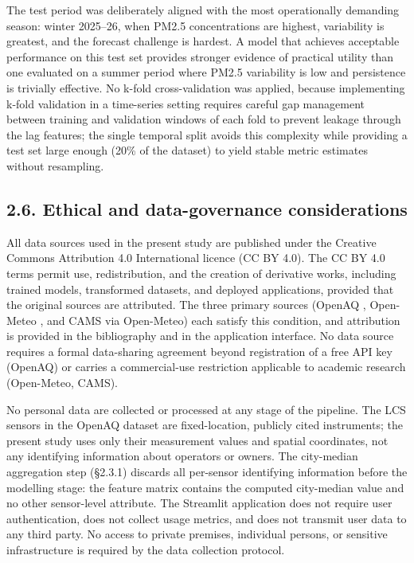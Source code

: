 The test period was deliberately aligned with the most operationally demanding season: winter 2025--26, when PM2.5 concentrations are highest, variability is greatest, and the forecast challenge is hardest. A model that achieves acceptable performance on this test set provides stronger evidence of practical utility than one evaluated on a summer period where PM2.5 variability is low and persistence is trivially effective. No k-fold cross-validation was applied, because implementing k-fold validation in a time-series setting requires careful gap management between training and validation windows of each fold to prevent leakage through the lag features; the single temporal split avoids this complexity while providing a test set large enough (20\% of the dataset) to yield stable metric estimates without resampling.

\subsection{2.6. Ethical and data-governance considerations}\label{ethical-and-data-governance-considerations}

All data sources used in the present study are published under the Creative Commons Attribution 4.0 International licence (CC BY 4.0). The CC BY 4.0 terms permit use, redistribution, and the creation of derivative works, including trained models, transformed datasets, and deployed applications, provided that the original sources are attributed. The three primary sources (OpenAQ \cite{openaq_platform}, Open-Meteo \cite{zippenfenig_openmeteo_2023}, and CAMS via Open-Meteo) each satisfy this condition, and attribution is provided in the bibliography and in the application interface. No data source requires a formal data-sharing agreement beyond registration of a free API key (OpenAQ) or carries a commercial-use restriction applicable to academic research (Open-Meteo, CAMS).

No personal data are collected or processed at any stage of the pipeline. The LCS sensors in the OpenAQ dataset are fixed-location, publicly cited instruments; the present study uses only their measurement values and spatial coordinates, not any identifying information about operators or owners. The city-median aggregation step (§2.3.1) discards all per-sensor identifying information before the modelling stage: the feature matrix contains the computed city-median value and no other sensor-level attribute. The Streamlit application does not require user authentication, does not collect usage metrics, and does not transmit user data to any third party. No access to private premises, individual persons, or sensitive infrastructure is required by the data collection protocol.

